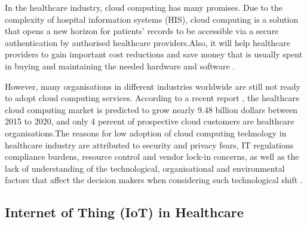 In the healthcare industry, cloud computing has many promises. Due to the complexity of hospital information systems (HIS), cloud computing is a solution that opens a new horizon for patients’ records to be accessible via a secure authentication by authorised healthcare providers\cite{Grindle2013}.Also, it will help healthcare providers to gain important cost reductions and save money that is usually spent in buying and maintaining the needed hardware and software \cite{ahuja2012survey,Masrom2014}.

However, many organisations in different industries worldwide are still not ready to adopt cloud computing services. According to a recent report \cite{MarketsandMarkets}, the healthcare cloud computing market is predicted to grow nearly 9.48 billion dollars between 2015 to 2020, and only 4 percent of prospective cloud customers are healthcare organisations.The reasons for low adoption of cloud computing technology in healthcare industry are attributed to security and privacy fears, IT regulations compliance burdens, resource control and vendor lock-in concerns, as well as the lack of understanding of the technological, organisational and environmental factors that affect the decision makers when considering such technological shift \cite{MarketsandMarkets,tweel2012examining}.




\subsection{Internet of Thing (IoT) in Healthcare}


